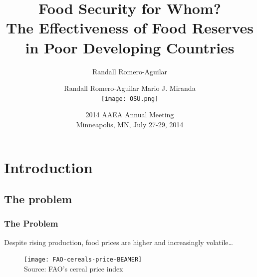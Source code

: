 \documentclass[svgnames]{beamer}
\begin{document}
\author[Romero-Aguilar]{Randall Romero-Aguilar}


\author[Romero-Aguilar, Miranda]{Randall Romero-Aguilar\hspace{3em} Mario J. Miranda\\ \vspace{1em}
	\texttt{[image: OSU.png]}}


\title[Food Security for Whom?]{Food Security for Whom?\\ \small{The Effectiveness of Food Reserves in Poor Developing Countries }}
\date[2014 AAEA Meeting]{2014 AAEA Annual Meeting\\Minneapolis, MN, July 27-29, 2014}





\begin{frame} %
  \titlepage
\end{frame}






\section{Introduction}
\subsection{The problem}
\begin{frame}
\frametitle{The Problem}
Despite rising production, food prices are higher and increasingly volatile\dots

\begin{figure}%
\centering
\texttt{[image: FAO-cereals-price-BEAMER]}    \\
\flushleft\tiny{Source: FAO's cereal price index}
\end{figure}
\end{frame}
\end{document}
